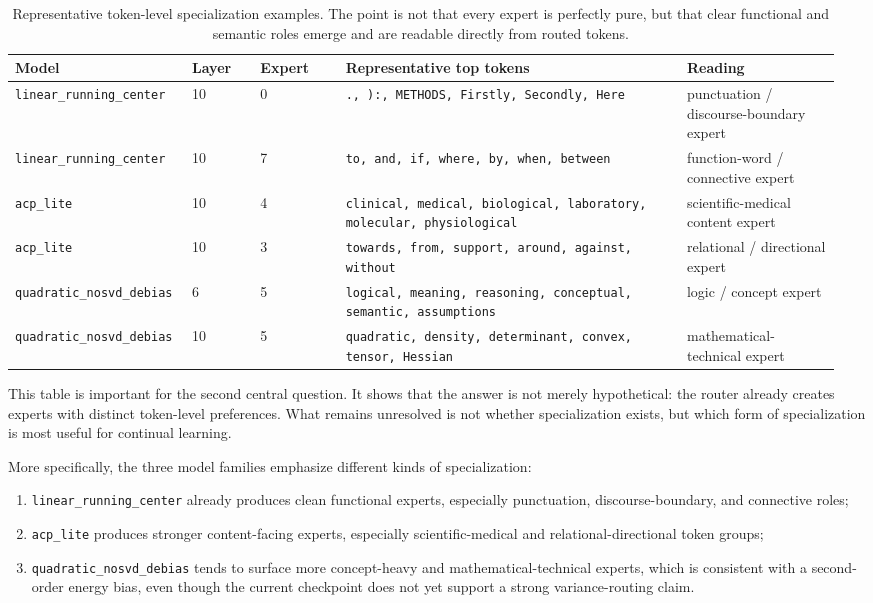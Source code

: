 \documentclass[11pt]{article}
\newcommand{\tablesize}{\footnotesize}
\begin{document}
\begin{table}[H]
\centering
\tablesize
\begin{adjustbox}{max width=\linewidth}
\begin{tabular}{p{0.20\linewidth}p{0.08\linewidth}p{0.10\linewidth}p{0.40\linewidth}p{0.18\linewidth}}
\toprule
Model & Layer & Expert & Representative top tokens & Reading \\
\midrule
\texttt{linear\_running\_center} & 10 & 0 & \texttt{., ):, METHODS, Firstly, Secondly, Here} & punctuation / discourse-boundary expert \\
\texttt{linear\_running\_center} & 10 & 7 & \texttt{to, and, if, where, by, when, between} & function-word / connective expert \\
\texttt{acp\_lite} & 10 & 4 & \texttt{clinical, medical, biological, laboratory, molecular, physiological} & scientific-medical content expert \\
\texttt{acp\_lite} & 10 & 3 & \texttt{towards, from, support, around, against, without} & relational / directional expert \\
\texttt{quadratic\_nosvd\_debias} & 6 & 5 & \texttt{logical, meaning, reasoning, conceptual, semantic, assumptions} & logic / concept expert \\
\texttt{quadratic\_nosvd\_debias} & 10 & 5 & \texttt{quadratic, density, determinant, convex, tensor, Hessian} & mathematical-technical expert \\
\bottomrule
\end{tabular}
\end{adjustbox}
\caption{Representative token-level specialization examples. The point is not that every expert is perfectly pure, but that clear functional and semantic roles emerge and are readable directly from routed tokens.}
\label{tab:token-audit}
\end{table}

This table is important for the second central question. It shows that the answer is not merely hypothetical: the router already creates experts with distinct token-level preferences. What remains unresolved is not whether specialization exists, but which form of specialization is most useful for continual learning.

More specifically, the three model families emphasize different kinds of specialization:
\begin{enumerate}
    \item \texttt{linear\_running\_center} already produces clean functional experts, especially punctuation, discourse-boundary, and connective roles;
    \item \texttt{acp\_lite} produces stronger content-facing experts, especially scientific-medical and relational-directional token groups;
    \item \texttt{quadratic\_nosvd\_debias} tends to surface more concept-heavy and mathematical-technical experts, which is consistent with a second-order energy bias, even though the current checkpoint does not yet support a strong variance-routing claim.
\end{enumerate}
\end{document}

